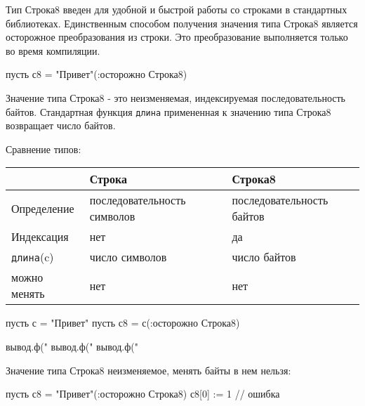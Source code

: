 Тип Строка8 введен для удобной и быстрой работы со строками в стандартных библиотеках. 
Единственным способом получения значения типа Строка8 является осторожное преобразования из строки. 
Это преобразование выполняется только во время компиляции.

\begin{Trivil}
пусть с8 = "Привет"(:осторожно Строка8)
\end{Trivil}

Значение типа Строка8 - это неизменяемая, индексируемая последовательность байтов.
Стандартная функция \verb+длина+ примененная к значению типа Строка8 возвращает число байтов.

\bigskip
Сравнение типов:

\bigskip
\begin{tabular}[c]{l|p{3.5cm}|p{3.5cm}}
& \textbf{Строка} & \textbf{Строка8}  \\ 
\hline
Определение &  последовательность символов & последовательность байтов \\
Индексация & нет & да \\
\verb+длина+(c) & число символов & число байтов \\
можно менять & нет & нет \\
\hline
\end{tabular}

\begin{Trivil}
пусть с = "Привет"
пусть с8 = с(:осторожно Строка8)

вывод.ф("%
вывод.ф("%
вывод.ф("%
\end{Trivil}

Значение типа Строка8 неизменяемое, менять байты в нем нельзя:
\begin{SampleErr}[vspace=2pt]
    пусть с8 = "Привет"(:осторожно Строка8)
    с8[0] := 1 // ошибка
\end{SampleErr}